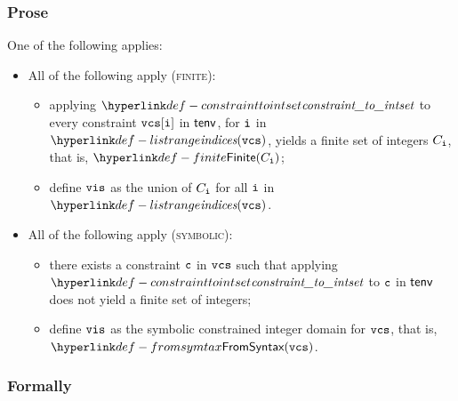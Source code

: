 \subsubsection{Prose}
One of the following applies:
\begin{itemize}
  \item All of the following apply (\textsc{finite}):
  \begin{itemize}
    \item applying $\constrainttointset$ to every constraint $\vcs[\vi]$ in $\tenv$, for $\vi$ in \\ $\listrange(\vcs)$,
          yields a finite set of integers $C_\vi$, that is, $\Finite(C_\vi)$;
    \item define $\vis$ as the union of $C_\vi$ for all $\vi$ in $\listrange(\vcs)$.
  \end{itemize}

  \item All of the following apply (\textsc{symbolic}):
  \begin{itemize}
    \item there exists a constraint $\vc$ in $\vcs$ such that applying $\constrainttointset$ to $\vc$
          in $\tenv$ does not yield a finite set of integers;
    \item define $\vis$ as the symbolic constrained integer domain for $\vcs$, that is, \\
          $\FromSyntax(\vcs)$.
  \end{itemize}
\end{itemize}

\subsubsection{Formally}
\begin{mathpar}
\end{mathpar}

\begin{mathpar}
\end{mathpar}

